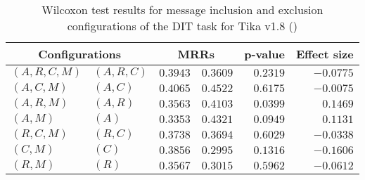 
\begin{table}
\begin{spacing}{1.2}
\centering
\caption{Wilcoxon test results for message inclusion and exclusion configurations of the DIT task for Tika v1.8 (\ctwo)}
\label{table:versus-wilcox-tika-dit-message}
\begin{tabular}{ll|rr|rr}
\toprule
      \multicolumn{2}{c|}{Configurations} &                \multicolumn{2}{c|}{MRRs} &             p-value & Effect size \\
\midrule
 $(A,R,C,M)$ &  $(A,R,C)$ &  $\bm{0.3943}$ &       $0.3609$ & $0.2319$ &   $-0.0775$ \\
   $(A,C,M)$ &    $(A,C)$ &       $0.4065$ &  $\bm{0.4522}$ & $0.6175$ &   $-0.0075$ \\
   $(A,R,M)$ &    $(A,R)$ &       $0.3563$ &  $\bm{0.4103}$ & $0.0399$ &    $0.1469$ \\
     $(A,M)$ &      $(A)$ &       $0.3353$ &  $\bm{0.4321}$ & $0.0949$ &    $0.1131$ \\
   $(R,C,M)$ &    $(R,C)$ &  $\bm{0.3738}$ &       $0.3694$ & $0.6029$ &   $-0.0338$ \\
     $(C,M)$ &      $(C)$ &  $\bm{0.3856}$ &       $0.2995$ & $0.1316$ &   $-0.1606$ \\
     $(R,M)$ &      $(R)$ &  $\bm{0.3567}$ &       $0.3015$ & $0.5962$ &   $-0.0612$ \\
\bottomrule
\end{tabular}

\end{spacing}
\end{table}

